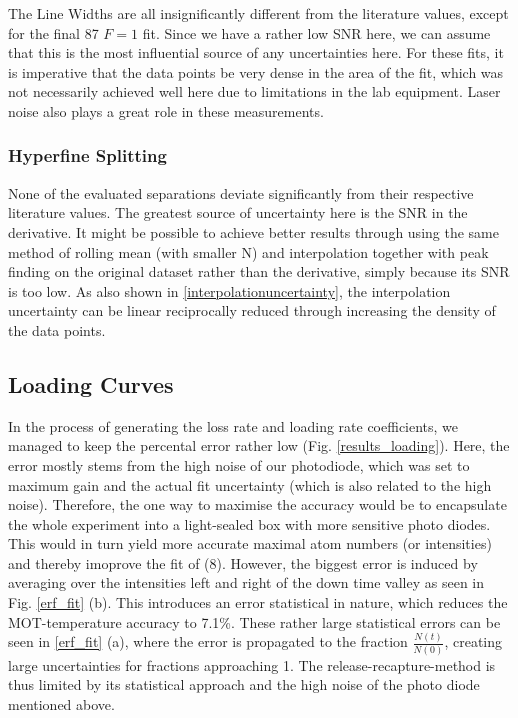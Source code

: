 \documentclass[12pt, a4paper]{article}
\begin{document}
The Line Widths are all insignificantly different from the literature values, except for the final 87 $F = 1$ fit. Since we have a rather low SNR here, we can assume that this is the most influential source of any uncertainties here. For these fits, it is imperative that the data points be very dense in the area of the fit, which was not necessarily achieved well here due to limitations in the lab equipment. Laser noise also plays a great role in these measurements.

\subsubsection{Hyperfine Splitting}
None of the evaluated separations deviate significantly from their respective literature values. The greatest source of uncertainty here is the SNR in the derivative. It might be possible to achieve better results through using the same method of rolling mean (with smaller N) and interpolation together with peak finding on the original dataset rather than the derivative, simply because its SNR is too low. As also shown in \autoref{interpolationuncertainty}, the interpolation uncertainty can be linear reciprocally reduced through increasing the density of the data points.

\subsection{Loading Curves}
In the process of generating the loss rate and loading rate coefficients, we managed to keep the percental error rather low (Fig. \ref{results_loading}). Here, the error mostly stems from the high noise of our photodiode, which was set to maximum gain and the actual fit uncertainty (which is also related to the high noise). Therefore, the one way to maximise the accuracy would be to encapsulate the whole experiment into a light-sealed box with more sensitive photo diodes. This would in turn yield more accurate maximal atom numbers (or intensities) and thereby imoprove the fit of (8). However, the biggest error is induced by averaging over the intensities left and right of the down time valley as seen in Fig. \ref{erf_fit} (b). This introduces an error statistical in nature, which reduces the MOT-temperature accuracy to 7.1\%. These rather large statistical errors can be seen in \ref{erf_fit} (a), where the error is propagated to the fraction $\frac{N(t)}{N(0)}$, creating large uncertainties for fractions approaching 1. The release-recapture-method is thus limited by its statistical approach and the high noise of the photo diode mentioned above.
\end{document}

